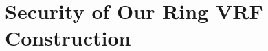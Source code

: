 \newcommand{\name}{rVRF}
\section{Security of Our Ring VRF Construction} 
\label{ap:ucproof}
\label{sec:ringvrfconstrnoPK}
\newcommand{\GG}{\grE}
\newcommand{\FF}{\F}
\newcommand{\hash}{H}
\newcommand{\hashG}{\hash_\grE}
\newcommand{\gen}{\mathsf{Gen}}
\newcommand{\hkeys}{\mathtt{honest\_keys}}
\newcommand{\malkeys}{\mathtt{malicious\_keys}}
\newcommand{\rcom}{\mathcal{R}_{eval}}
\newcommand{\rsnark}{\Rring}
\newcommand{\counter}{\mathsf{counter}}
\newcommand{\bdv}{\mathcal{B}}
\newcommand{\abort}{\textsc{Abort}}
\newcommand{\pkeys}{\arraysym{public\_keys}}
\newcommand{\skeys}{\arraysym{secret\_keys}}
\newcommand{\keytransform}{T_{\mathsf{key}}}
%
%
%	
%	
%	
%	
%
